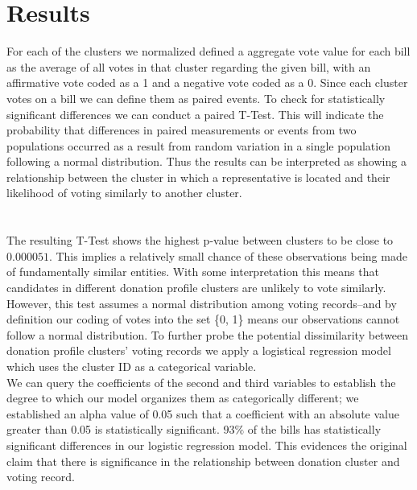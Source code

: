 \documentclass[journal]{IEEEtran}
\begin{document}
\section{Results}
For each of the clusters we normalized defined a aggregate vote value for each bill as the average of all votes in that cluster regarding the given bill, with an affirmative vote coded as a 1 and a negative vote coded as a 0. Since each cluster votes on a bill we 
can define them as paired events. To check for statistically significant differences we can conduct a paired T-Test. This will indicate the probability that differences in paired measurements or events from two populations occurred as a result from random variation in a single population following a normal distribution. Thus the results can be interpreted as showing a 
relationship between the cluster in which a representative is located and their likelihood of voting similarly to another cluster.\\
\\\\
The resulting T-Test shows the highest p-value between clusters to be close to $0.000051$. This implies a relatively small chance of these observations being made of fundamentally similar entities. With some interpretation this means that candidates in different donation profile clusters are unlikely to vote similarly. However, this test 
assumes a normal distribution among voting records--and by definition our coding of votes into the set \{0, 1\} means our observations cannot follow a normal distribution. To further probe the potential dissimilarity between donation profile clusters' voting records we apply a logistical regression model which
uses the cluster ID as a categorical variable.\\ We can query the coefficients of the second and third variables to establish the degree to which our model organizes them as categorically different; we established an alpha value of 0.05 such that a coefficient with an absolute value greater than 0.05 is statistically significant. $93\%$ of the bills has statistically significant differences in our logistic regression model. This evidences the original claim that there is 
significance in the relationship between donation cluster and voting record.\\\\
\\\\
\end{document}
